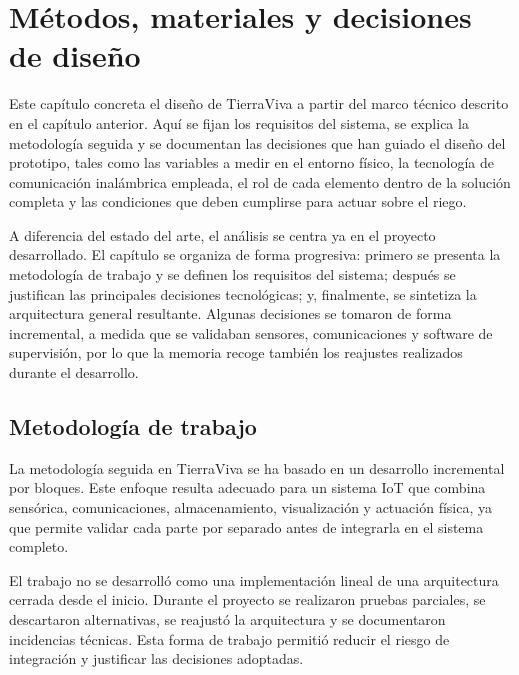\chapter{Métodos, materiales y decisiones de diseño}
\label{cap:capitulo3}

Este capítulo concreta el diseño de TierraViva a partir del marco técnico descrito en el capítulo anterior. Aquí se fijan los requisitos del sistema, se explica la metodología seguida y se documentan las decisiones que han guiado el diseño del prototipo, tales como las variables a medir en el entorno físico, la tecnología de comunicación inalámbrica empleada, el rol de cada elemento dentro de la solución completa y las condiciones que deben cumplirse para actuar sobre el riego.

A diferencia del estado del arte, el análisis se centra ya en el proyecto desarrollado. El capítulo se organiza de forma progresiva: primero se presenta la metodología de trabajo y se definen los requisitos del sistema; después se justifican las principales decisiones tecnológicas; y, finalmente, se sintetiza la arquitectura general resultante. Algunas decisiones se tomaron de forma incremental, a medida que se validaban sensores, comunicaciones y software de supervisión, por lo que la memoria recoge también los reajustes realizados durante el desarrollo.

\section{Metodología de trabajo}
\label{sec:metodologia_trabajo}

La metodología seguida en TierraViva se ha basado en un desarrollo incremental por bloques. Este enfoque resulta adecuado para un sistema IoT que combina sensórica, comunicaciones, almacenamiento, visualización y actuación física, ya que permite validar cada parte por separado antes de integrarla en el sistema completo.

El trabajo no se desarrolló como una implementación lineal de una arquitectura cerrada desde el inicio. Durante el proyecto se realizaron pruebas parciales, se descartaron alternativas, se reajustó la arquitectura y se documentaron incidencias técnicas. Esta forma de trabajo permitió reducir el riesgo de integración y justificar las decisiones adoptadas.

